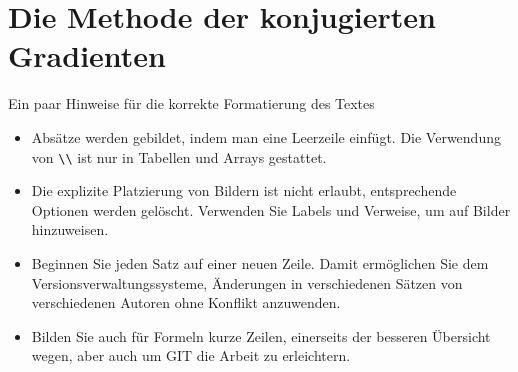 %
%
%
\chapter{Die Methode der konjugierten Gradienten\label{chapter:cg}}
\begin{refsection}

Ein paar Hinweise für die korrekte Formatierung des Textes
\begin{itemize}
\item
Absätze werden gebildet, indem man eine Leerzeile einfügt.
Die Verwendung von \verb+\\+ ist nur in Tabellen und Arrays gestattet.
\item
Die explizite Platzierung von Bildern ist nicht erlaubt, entsprechende
Optionen werden gelöscht. 
Verwenden Sie Labels und Verweise, um auf Bilder hinzuweisen.
\item
Beginnen Sie jeden Satz auf einer neuen Zeile. 
Damit ermöglichen Sie dem Versionsverwaltungssysteme, Änderungen
in verschiedenen Sätzen von verschiedenen Autoren ohne Konflikt 
anzuwenden.
\item 
Bilden Sie auch für Formeln kurze Zeilen, einerseits der besseren
Übersicht wegen, aber auch um GIT die Arbeit zu erleichtern.
\end{itemize}






\printbibliography[heading=subbibliography]
\end{refsection}
